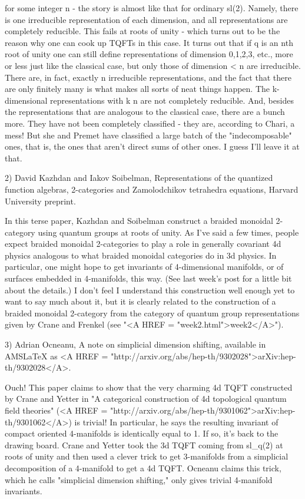 for some integer n - the story is almost like that
for ordinary sl(2).  Namely, there is one irreducible representation
of each dimension, and all representations are completely reducible.
This fails at roots of unity - which turns out to be the reason why
one can cook up TQFTs in this case.  It turns out that if q is an nth
root of unity one can still define representations of dimension
0,1,2,3, etc., more or less just like the classical case, but only
those of dimension < n are irreducible.  There are, in fact,
exactly n irreducible representations, and the fact that there are
only finitely many is what makes all sorts of neat things happen.  The
k-dimensional representations with k \ge  n are not completely
reducible.  And, besides the representations that are analogous to the
classical case, there are a bunch more.  They have not been completely
classified - they are, according to Chari, a mess!  But she and Premet
have classified a large batch of the "indecomposable" ones, that is,
the ones that aren't direct sums of other ones.  I guess I'll leave it
at that.
 
2) David Kazhdan and Iakov Soibelman, Representations of the quantized
function algebras, 2-categories and Zamolodchikov tetrahedra
equations, Harvard University preprint.

In this terse paper, Kazhdan and Soibelman construct a braided
monoidal 2-category using quantum groups at roots of unity.  As I've
said a few times, people expect braided monoidal 2-categories to play
a role in generally covariant 4d physics analogous to what braided
monoidal categories do in 3d physics.  In particular, one might hope
to get invariants of 4-dimensional manifolds, or of surfaces embedded
in 4-manifolds, this way.  (See last week's post for a little bit
about the details.)  I don't feel I understand this construction well
enough yet to want to say much about it, but it is clearly related to
the construction of a braided monoidal 2-category from the category of
quantum group representations given by Crane and Frenkel (see "<A HREF
= "week2.html">week2</A>").

3) Adrian Ocneanu, A note on simplicial dimension shifting, 
available in AMSLaTeX as <A HREF =
"http://arxiv.org/abs/hep-th/9302028">arXiv:hep-th/9302028</A>.

Ouch!  This paper claims to show that the very charming 4d TQFT
constructed by Crane and Yetter in "A categorical construction of 4d
topological quantum field theories" (<A HREF =
"http://arxiv.org/abs/hep-th/9301062">arXiv:hep-th/9301062</A>) is
trivial!  In particular, he says the resulting invariant of compact
oriented 4-manifolds is identically equal to 1.  If so, it's back to
the drawing board.  Crane and Yetter took the 3d TQFT coming from
sl_{q}(2) at roots of unity and then used a clever trick to
get 3-manifolds from a simplicial decomposition of a 4-manifold to get
a 4d TQFT.  Ocneanu claims this trick, which he calls "simplicial
dimension shifting," only gives trivial 4-manifold invariants.

